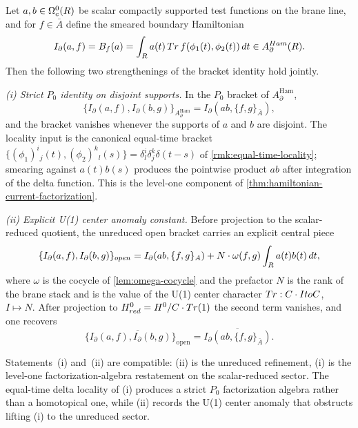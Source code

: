 \documentclass[11pt]{memoir}
\begin{document}
\begin{cor}\label{cor:local-bulk-boundary-coupling}
  Let $a,b\in\Omega^0_c(R)$ be scalar compactly supported test
  functions on the brane line, and for $f\in\bar A$ define the smeared
  boundary Hamiltonian
  $$I_\partial(a,f)
    =B_f(a)
    =\int_{R} a(t)\,
      Tr\,f(\phi_1(t),\phi_2(t))\,dt
    \in A_\partial^{Ham}(R).$$
  Then the following two strengthenings of the bracket identity hold
  jointly.

  \emph{(i) Strict $P_0$ identity on disjoint supports.} In the $P_0$
  bracket of $A_\partial^{\mathrm{Ham}}$,
  $$\{I_\partial(a,f),I_\partial(b,g)\}_{A_\partial^{\mathrm{Ham}}}
    =I_\partial(ab,\{f,g\}_{\bar A}),$$
  and the bracket vanishes whenever the supports of $a$ and $b$ are
  disjoint. The locality input is the canonical equal-time bracket
  $\{(\phi_1)^i{}_j(t),(\phi_2)^k{}_l(s)\}=\delta^i_l\delta^k_j\delta(t-s)$
  of \ref{rmk:equal-time-locality}; smearing against $a(t)b(s)$
  produces the pointwise product $ab$ after integration of the delta
  function. This is the level-one component of
  \ref{thm:hamiltonian-current-factorization}.

  \emph{(ii) Explicit U(1) center anomaly constant.} Before projection
  to the scalar-reduced quotient, the unreduced open bracket carries an
  explicit central piece
  $$\{I_\partial(a,f),I_\partial(b,g)\}_{open}
    =I_\partial(ab,\{f,g\}_{A})
    +N\cdot\omega(f,g)\int_{R} a(t)b(t)\,dt,$$
  where $\omega$ is the cocycle of \ref{lem:omega-cocycle} and the
  prefactor $N$ is the rank of the brane stack and is the value of the
  U(1) center character $Tr:C\cdot ItoC$, $I\mapsto N$.
  After projection to $H^0_{red}=H^0/C\cdot Tr(1)$
  the second term vanishes, and one recovers
  $$\overline{\{I_\partial(a,f),I_\partial(b,g)\}_{\mathrm{open}}}
    =\overline{I_\partial(ab,\{f,g\}_{\bar A})}.$$

  Statements~(i) and~(ii) are compatible: (ii) is the unreduced
  refinement, (i) is the level-one factorization-algebra restatement
  on the scalar-reduced sector. The equal-time delta locality of (i)
  produces a strict $P_0$ factorization algebra rather than a
  homotopical one, while (ii) records the U(1) center anomaly that
  obstructs lifting (i) to the unreduced sector.
\end{cor}
\end{document}
